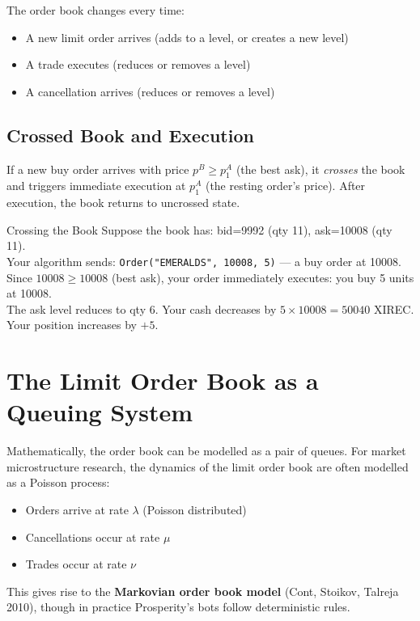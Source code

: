 \documentclass[12pt,a4paper,openany]{report}
\theoremstyle{definition}
\begin{document}
The order book changes every time:
\begin{itemize}
  \item A new limit order arrives (adds to a level, or creates a new level)
  \item A trade executes (reduces or removes a level)
  \item A cancellation arrives (reduces or removes a level)
\end{itemize}

\subsection{Crossed Book and Execution}

If a new buy order arrives with price $p^B \geq p_1^A$ (the best ask), it \emph{crosses} the book and triggers immediate execution at $p_1^A$ (the resting order's price). After execution, the book returns to uncrossed state.

\begin{examplebox}{Crossing the Book}
Suppose the book has: bid=9992 (qty 11), ask=10008 (qty 11). \\
Your algorithm sends: \texttt{Order("EMERALDS", 10008, 5)} — a buy order at 10008. \\
Since $10008 \geq 10008$ (best ask), your order immediately executes: you buy 5 units at 10008. \\
The ask level reduces to qty 6. Your cash decreases by $5 \times 10008 = 50040$ XIREC. \\
Your position increases by $+5$.
\end{examplebox}

\section{The Limit Order Book as a Queuing System}

Mathematically, the order book can be modelled as a pair of queues. For market microstructure research, the dynamics of the limit order book are often modelled as a Poisson process:
\begin{itemize}
  \item Orders arrive at rate $\lambda$ (Poisson distributed)
  \item Cancellations occur at rate $\mu$
  \item Trades occur at rate $\nu$
\end{itemize}
This gives rise to the \textbf{Markovian order book model} (Cont, Stoikov, Talreja 2010), though in practice Prosperity's bots follow deterministic rules.
\end{document}
